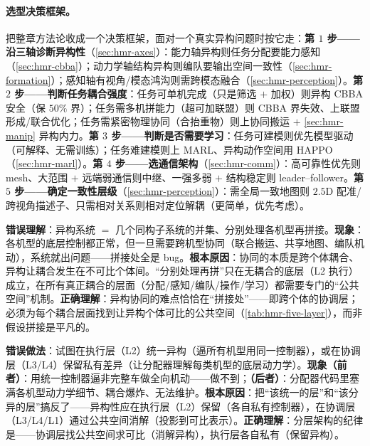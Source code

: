 \paragraph{选型决策框架。}
把整章方法论收成一个决策框架，面对一个真实异构问题时按它走：\textbf{第 $1$ 步——沿三轴诊断异构性}（\cref{sec:hmr-axes}）：能力轴异构则任务分配要能力感知（\cref{sec:hmr-cbba}）；动力学轴结构异构则编队要输出空间一致性（\cref{sec:hmr-formation}）；感知轴有视角/模态鸿沟则需跨模态融合（\cref{sec:hmr-perception}）。\textbf{第 $2$ 步——判断任务耦合强度}：任务可单机完成（只是筛选 $+$ 加权）则异构 CBBA 安全（保 $50\%$ 界）；任务需多机拼能力（超可加联盟）则 CBBA 界失效、上联盟形成/联合优化；任务需紧密物理协同（合抬重物）则上协同搬运 $+$ \cref{sec:hmr-manip} 异构内力。\textbf{第 $3$ 步——判断是否需要学习}：任务可建模则优先模型驱动（可解释、无需训练）；任务难建模则上 MARL、异构动作空间用 HAPPO（\cref{sec:hmr-marl}）。\textbf{第 $4$ 步——选通信架构}（\cref{sec:hmr-comm}）：高可靠性优先则 mesh、大范围 $+$ 远端弱通信则中继、一强多弱 $+$ 结构稳定则 leader--follower。\textbf{第 $5$ 步——确定一致性层级}（\cref{sec:hmr-perception}）：需全局一致地图则 $2.5\mathrm{D}$ 配准/跨视角描述子、只需相对关系则相对定位解耦（更简单，优先考虑）。

\begin{pitfall}[概念误区：“把每种机型当同构小组分别处理再拼起来 $=$ 异构协同”]
\textbf{错误理解}：异构系统 $=$ 几个同构子系统的并集、分别处理各机型再拼接。\textbf{现象}：各机型的底层控制都正常，但一旦需要跨机型协同（联合搬运、共享地图、编队机动），系统就出问题——拼接处全是 bug。\textbf{根本原因}：协同的本质是跨个体耦合、异构让耦合发生在不可比个体间。“分别处理再拼”只在无耦合的底层（L2 执行）成立，在所有真正耦合的层面（分配/感知/编队/操作/学习）都需要专门的“公共空间”机制。\textbf{正确理解}：异构协同的难点恰恰在“拼接处”——即跨个体的协调层；必须为每个耦合层面找到让异构个体可比的公共空间（\cref{tab:hmr-five-layer}），而非假设拼接是平凡的。
\end{pitfall}

\begin{pitfall}
\textbf{错误做法}：试图在执行层（L2）统一异构（逼所有机型用同一控制器），或在协调层（L3/L4）保留私有差异（让分配器理解每类机型的底层动力学）。\textbf{现象（前者）}：用统一控制器逼非完整车做全向机动——做不到；\textbf{（后者）}：分配器代码里塞满各机型动力学细节、耦合爆炸、无法维护。\textbf{根本原因}：把“该统一的层”和“该分异的层”搞反了——异构性应在执行层（L2）保留（各自私有控制器），在协调层（L3/L4/L1）通过公共空间消解（投影到可比表示）。\textbf{正确理解}：分层架构的纪律是——协调层找公共空间求可比（消解异构），执行层各自私有（保留异构）。
\end{pitfall}

